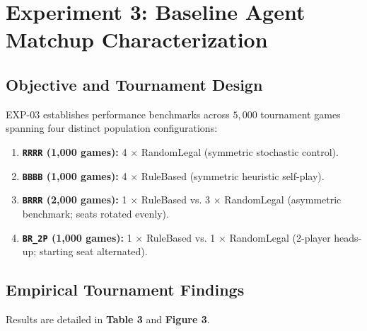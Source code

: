 \documentclass[11pt]{article}
\begin{document}
\section{Experiment 3: Baseline Agent Matchup Characterization}
\label{sec:exp03_baselines}

\subsection{Objective and Tournament Design}
EXP-03 establishes performance benchmarks across $5,000$ tournament games spanning four distinct population configurations:
\begin{enumerate}
  \item \textbf{\texttt{RRRR} (1,000 games):} 4 $\times$ RandomLegal (symmetric stochastic control).
  \item \textbf{\texttt{BBBB} (1,000 games):} 4 $\times$ RuleBased (symmetric heuristic self-play).
  \item \textbf{\texttt{BRRR} (2,000 games):} 1 $\times$ RuleBased vs. 3 $\times$ RandomLegal (asymmetric benchmark; seats rotated evenly).
  \item \textbf{\texttt{BR\_2P} (1,000 games):} 1 $\times$ RuleBased vs. 1 $\times$ RandomLegal (2-player heads-up; starting seat alternated).
\end{enumerate}

\subsection{Empirical Tournament Findings}
Results are detailed in \textbf{Table 3} and \textbf{Figure 3}.
\end{document}
